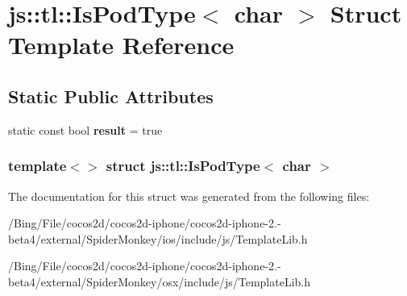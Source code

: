 \hypertarget{structjs_1_1tl_1_1_is_pod_type_3_01char_01_4}{\section{js\-:\-:tl\-:\-:Is\-Pod\-Type$<$ char $>$ Struct Template Reference}
\label{structjs_1_1tl_1_1_is_pod_type_3_01char_01_4}
}
\subsection*{Static Public Attributes}
\begin{DoxyCompactItemize}
\item 
\hypertarget{structjs_1_1tl_1_1_is_pod_type_3_01char_01_4_a74d3f78cee06cdf90ab073e64d7a7021}{static const bool {\bfseries result} = true}\label{structjs_1_1tl_1_1_is_pod_type_3_01char_01_4_a74d3f78cee06cdf90ab073e64d7a7021}

\end{DoxyCompactItemize}
\subsubsection*{template$<$$>$ struct js\-::tl\-::\-Is\-Pod\-Type$<$ char $>$}



The documentation for this struct was generated from the following files\-:\begin{DoxyCompactItemize}
\item 
/\-Bing/\-File/cocos2d/cocos2d-\/iphone/cocos2d-\/iphone-\/2.-\/beta4/external/\-Spider\-Monkey/ios/include/js/Template\-Lib.\-h\item 
/\-Bing/\-File/cocos2d/cocos2d-\/iphone/cocos2d-\/iphone-\/2.-\/beta4/external/\-Spider\-Monkey/osx/include/js/Template\-Lib.\-h\end{DoxyCompactItemize}
